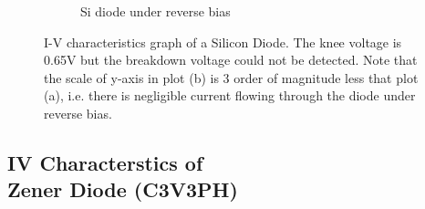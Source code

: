 \begin{figure}[H]
\begin{subfigure}[b]{0.45\textwidth}
         \caption{Si diode under reverse bias}
         \label{fig2}
     \end{subfigure}
     \hfill
        \caption{I-V characteristics graph of a Silicon Diode. The knee voltage is 0.65V but the breakdown voltage could not be detected. Note that the scale of y-axis in plot (b) is 3 order of magnitude less that plot (a), i.e. there is negligible current flowing through the diode under reverse bias.}
        \label{f1}
\end{figure}
\vspace{80pt}
\subsection{IV Characterstics of\\Zener Diode (C3V3PH)}

